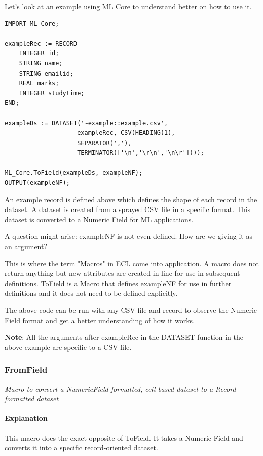 \documentclass[a4paper,oneside,12pt]{book}
\begin{document}
Let's look at an example using ML Core to understand better on how to use it.

\begin{lstlisting}
IMPORT ML_Core;

exampleRec := RECORD
    INTEGER id;
    STRING name;
    STRING emailid;
    REAL marks;
    INTEGER studytime;
END;

exampleDs := DATASET('~example::example.csv', 
                    exampleRec, CSV(HEADING(1),
                    SEPARATOR(','),
                    TERMINATOR(['\n','\r\n','\n\r'])));

ML_Core.ToField(exampleDs, exampleNF);
OUTPUT(exampleNF);
\end{lstlisting}

An example record is defined above which defines the shape of each record in the dataset. A dataset is created from a sprayed CSV file in a specific format. This dataset is converted to a Numeric Field for ML applications.

A question might arise: exampleNF is not even defined. How are we giving it as an argument?

This is where the term "Macros" in ECL come into application. A macro does not return anything but new attributes are created in-line for use in subsequent definitions. ToField is a Macro that defines exampleNF for use in further definitions and it does not need to be defined explicitly.

The above code can be run with any CSV file and record to observe the Numeric Field format and get a better understanding of how it works.

\textbf{Note}: All the arguments after exampleRec in the DATASET function in the above example are specific to a CSV file.

\subsubsection{FromField}\label{mlcore:fromfield}

\textit{Macro to convert a NumericField formatted, cell-based dataset to a Record formatted dataset}

\paragraph{Explanation}

This macro does the exact opposite of ToField. It takes a Numeric Field and converts it into a specific record-oriented dataset. 
\end{document}
